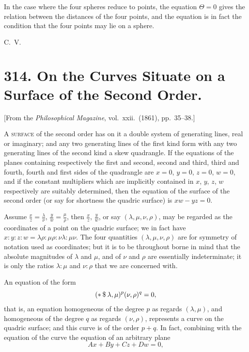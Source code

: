 \documentclass[11pt,a4paper]{article}
\theoremstyle{plain}
\begin{document}
In the case where the four spheres reduce to points, the equation $\Theta = 0$ gives the relation between the distances of the four points, and the equation is in fact the condition that the four points may lie on a sphere.

\medskip
\noindent C.\ V.


\newpage
\section*{314. On the Curves Situate on a Surface of the Second Order.}

[From the \textit{Philosophical Magazine}, vol.\ xxii.\ (1861), pp.\ 35--38.]

\medskip

A \textsc{surface} of the second order has on it a double system of generating lines, real or imaginary; and any two generating lines of the first kind form with any two generating lines of the second kind a skew quadrangle. If the equations of the planes containing respectively the first and second, second and third, third and fourth, fourth and first sides of the quadrangle are $x = 0$, $y = 0$, $z = 0$, $w = 0$, and if the constant multipliers which are implicitly contained in $x$, $y$, $z$, $w$ respectively are suitably determined, then the equation of the surface of the second order (or say for shortness the quadric surface) is $xw - yz = 0$.

Assume $\frac{x}{z} = \frac{\lambda}{\nu}$, $\frac{y}{w} = \frac{\mu}{\rho}$, then $\frac{x}{z}$, $\frac{y}{w}$, or say $(\lambda, \mu, \nu, \rho)$, may be regarded as the coordinates of a point on the quadric surface; we in fact have $x : y : z : w = \lambda\rho : \mu\rho : \nu\lambda : \mu\nu$. The four quantities $(\lambda, \mu, \nu, \rho)$ are for symmetry of notation used as coordinates; but it is to be throughout borne in mind that the absolute magnitudes of $\lambda$ and $\mu$, and of $\nu$ and $\rho$ are essentially indeterminate; it is only the ratios $\lambda : \mu$ and $\nu : \rho$ that we are concerned with.

An equation of the form
\[
(* \mathbin{\char`\$} \lambda, \mu)^p (\nu, \rho)^q = 0,
\]
that is, an equation homogeneous of the degree $p$ as regards $(\lambda, \mu)$, and homogeneous of the degree $q$ as regards $(\nu, \rho)$, represents a curve on the quadric surface; and this curve is of the order $p + q$. In fact, combining with the equation of the curve the equation of an arbitrary plane
\[
Ax + By + Cz + Dw = 0,
\]
\end{document}
